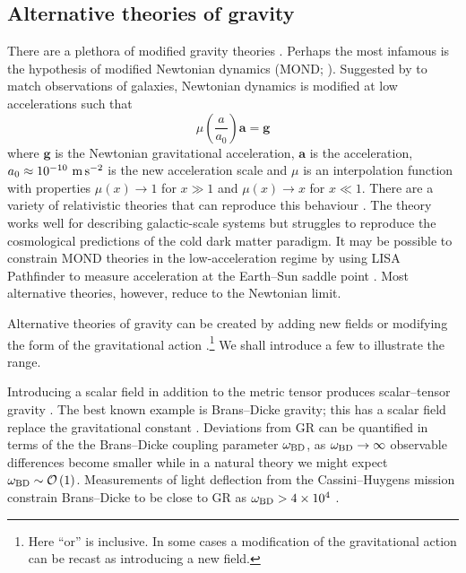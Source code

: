 \subsection{Alternative theories of gravity}

There are a plethora of modified gravity theories \citep{Clifton2012}. Perhaps the most infamous is the hypothesis of modified Newtonian dynamics (MOND; \citealt{Famaey2012}). Suggested by \citet{Milgrom1983,Milgrom1983a,Milgrom1983b} to match observations of galaxies, Newtonian dynamics is modified at low accelerations such that
\begin{equation}
\mu\left(\frac{a}{a_0}\right)\boldsymbol{a} = \boldsymbol{g}
\end{equation}
where $\boldsymbol{g}$ is the Newtonian gravitational acceleration, $\boldsymbol{a}$ is the acceleration, $a_0 \approx 10^{-10}~\mathrm{m\,s^{-2}}$ is the new acceleration scale and $\mu$ is an interpolation function with properties $\mu(x) \rightarrow 1$ for $x \gg 1$ and $\mu(x) \rightarrow x$ for $x \ll 1$. There are a variety of relativistic theories that can reproduce this behaviour \citep{Bekenstein2006}. The theory works well for describing galactic-scale systems but struggles to reproduce the cosmological predictions of the cold dark matter paradigm. It may be possible to constrain MOND theories in the low-acceleration regime by using LISA Pathfinder to measure acceleration at the Earth--Sun saddle point \citep{Magueijo2011,Galianni2011}. Most alternative theories, however, reduce to the Newtonian limit.

Alternative theories of gravity can be created by adding new fields or modifying the form of the gravitational action \citep{Gair2012a}.\footnote{Here ``or'' is inclusive. In some cases a modification of the gravitational action can be recast as introducing a new field.} We shall introduce a few to illustrate the range.

Introducing a scalar field in addition to the metric tensor produces scalar--tensor gravity \citep{Wagoner1970,Nordtvedt1970}. The best known example is Brans--Dicke gravity; this has a scalar field replace the gravitational constant \citep{Brans1961,Dicke1962}. Deviations from GR can be quantified in terms of the the Brans--Dicke coupling parameter $\omega_\mathrm{BD}$, as $\omega_\mathrm{BD} \rightarrow \infty$ observable differences become smaller while in a natural theory we might expect $\omega_\mathrm{BD} \sim \mathcal{O}\left({1}\right)$. Measurements of light deflection from the Cassini--Huygens mission \citep{Bertotti2003} constrain Brans--Dicke to be close to GR as $\omega_\mathrm{BD} > 4 \times 10^4$ \citep{Will2006}.

